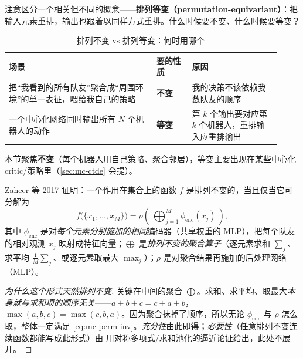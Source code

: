 \noindent 注意区分一个相关但不同的概念——\textbf{排列等变（permutation-equivariant）}：把输入元素重排，输出也跟着以同样方式重排。什么时候要不变、什么时候要等变？

\begin{table}[H]\centering\small
\caption{排列不变 vs 排列等变：何时用哪个}
\label{tab:mc-inv-equiv}
\begin{tabular}{p{0.50\linewidth}p{0.12\linewidth}p{0.30\linewidth}}
\toprule
场景 & 要的性质 & 原因 \\
\midrule
把“我看到的所有队友”聚合成“周围环境”的单一表征，喂给我自己的策略 & \textbf{不变} & 我的决策不该依赖我数队友的顺序 \\
一个中心化网络同时输出所有 $N$ 个机器人的动作 & \textbf{等变} & 第 $k$ 个输出要对应第 $k$ 个机器人，重排输入应重排输出 \\
\bottomrule
\end{tabular}
\end{table}

\noindent 本节聚焦\textbf{不变}（每个机器人用自己策略、聚合邻居），等变主要出现在某些中心化 critic/策略里（\cref{sec:mc-ctde} 会提）。

\begin{theorem}\label{thm:mc-deepsets}
Zaheer 等 2017 证明\cite{zaheer2017deepsets}：一个作用在集合上的函数 $f$ 是排列不变的，当且仅当它可分解为
\begin{equation}
  f\big(\{x_1,\dots,x_M\}\big)=\rho\!\left(\ \bigoplus_{j=1}^{M}\phi_{\mathrm{enc}}(x_j)\ \right),
  \label{eq:mc-deepsets}
\end{equation}
其中 $\phi_{\mathrm{enc}}$ 是对\emph{每个元素分别施加的相同}编码器（共享权重的 MLP），把每个队友的相对观测 $x_j$ 映射成特征向量；$\bigoplus$ 是\emph{排列不变的聚合算子}（逐元素求和 $\sum_j$、求平均 $\frac1M\sum_j$、或逐元素取最大 $\max_j$）；$\rho$ 是对聚合结果再施加的后处理网络（MLP）。
\end{theorem}

\begin{proof}[为什么这个形式天然排列不变]
关键在中间的聚合 $\bigoplus$。求和、求平均、取最大\emph{本身就与求和项的顺序无关}——$a+b+c=c+a+b$，$\max(a,b,c)=\max(c,b,a)$。因为聚合抹掉了顺序，所以无论 $\phi_{\mathrm{enc}}$ 与 $\rho$ 怎么取，整体一定满足 \cref{eq:mc-perm-inv}。\emph{充分性}由此即得；\emph{必要性}（任意排列不变连续函数都能写成此形式）由 \cite{zaheer2017deepsets} 用对称多项式/求和池化的逼近论证给出，此处不展开。
\end{proof}

